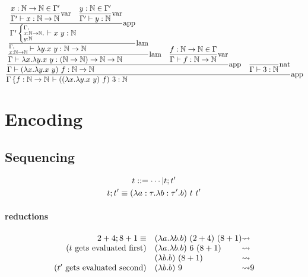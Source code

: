 \documentclass{article}
\newcommand{\st}[3][]{\ensuremath{\displaystyle\frac{#3\hfill}{#2\hfill} \text{#1}}}
\newcommand{\N}{\ensuremath \mathbb N}
\newcommand{\lam}[2]{\ensuremath{\lambda#1.#2}}
\begin{document}
\begin{equation*}
    \st[app]{
        \Gamma\left\{f:\N\to\N\right. \vdash ((\lam{x}{\lam{y}{x\ y}})\ f)\ 3:\N
    }{
        \st[app]{
            \Gamma\vdash (\lam{x}{\lam{y}{x\ y}})\ f: \N\to\N
        }{
            \st[lam]{
                \Gamma\vdash \lam{x}{\lam{y}{x\ y}}: (\N\to\N)\to\N\to\N
            }{
                \st[lam]{
                    \substack{\Gamma,\hfill\\x:\N\to\N}\vdash \lam{y}{x\ y}:\N\to\N
                }{
                    \st[app]{
                        \Gamma' \left\{ \substack{\Gamma,\hfill\\x:\N\to\N,\\y:\N\hfill} \right. \vdash x\ y:\N
                    }{
                        \st[var]{
                            \Gamma'\vdash x:\N\to\N
                        }{
                            x:\N\to\N\in\Gamma'
                        }
                        \quad
                        \st[var]{
                            \Gamma'\vdash y:\N
                        }{
                            y:\N\in\Gamma'
                        }
                    }
                }
            }
            \quad
            \st[var]{
                \Gamma\vdash f:\N\to\N
            }{
                f:\N\to\N\in\Gamma
            }
        }
        \quad
        \st[nat]{
            \Gamma\vdash 3:\N
        }{
        }
    }
\end{equation*}

\section{Encoding}
\subsection{Sequencing}
\begin{gather*}
    t ::= \cdots | t;t' \\
    t;t' \equiv (\lam{a:\tau}\lam{b:\tau'}{b})\ t\ t'
\end{gather*}
\paragraph{reductions}
\begin{align*}
    \begin{array}{r l @{\leadsto}l}
        2+4 ; 8+1 \equiv & (\lam{a}\lam{b}{b})\ (2+4)\ (8+1) \\
        (t\ \text{gets evaluated first})    & (\lam{a}\lam{b}{b})\ 6\ (8+1) \\
                                            & (\lam{b}{b})\ (8+1) \\
        (t'\ \text{gets evaluated second})  & (\lam{b}{b})\ 9 & 9
    \end{array}
\end{align*}
\end{document}
